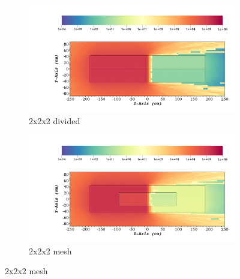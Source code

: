 \begin{figure}
	\begin{subfigure}[t]{0.5\textwidth}
		\includegraphics[width=\linewidth, trim={8cm 2cm 2cm 10cm},clip]{../figs/toy_p2/dose_VPII_2x_split.png}
		\caption{2x2x2 divided}
		\label{fig:2dose_2x_split}
	\end{subfigure}\hfill
	\begin{subfigure}[t]{0.5\textwidth}
		\includegraphics[width=\linewidth, trim={8cm 2cm 2cm 10cm},clip]{../figs/toy_p2/dose_VPII_2x_mesh.png}
		\caption{2x2x2 mesh}
		\label{fig:2dose_2x_mesh}
	\end{subfigure}


\end{figure}
